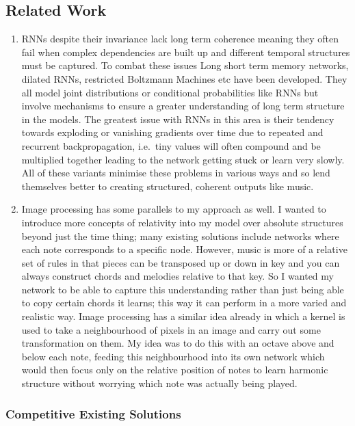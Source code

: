 \documentclass[12pt,]{article}
\begin{document}
\hypertarget{related-work}{%
\subsection{Related Work}\label{related-work}}

\begin{enumerate}
\def\labelenumi{\arabic{enumi}.}
\setcounter{enumi}{3}
\item
  RNNs despite their invariance lack long term coherence meaning they
  often fail when complex dependencies are built up and different
  temporal structures must be captured. To combat these issues Long
  short term memory networks, dilated RNNs, restricted Boltzmann
  Machines etc have been developed. They all model joint distributions
  or conditional probabilities like RNNs but involve mechanisms to
  ensure a greater understanding of long term structure in the models.
  The greatest issue with RNNs in this area is their tendency towards
  exploding or vanishing gradients over time due to repeated and
  recurrent backpropagation, i.e.~tiny values will often compound and be
  multiplied together leading to the network getting stuck or learn very
  slowly. All of these variants minimise these problems in various ways
  and so lend themselves better to creating structured, coherent outputs
  like music.
\item
  Image processing has some parallels to my approach as well. I wanted
  to introduce more concepts of relativity into my model over absolute
  structures beyond just the time thing; many existing solutions include
  networks where each note corresponds to a specific node. However,
  music is more of a relative set of rules in that pieces can be
  transposed up or down in key and you can always construct chords and
  melodies relative to that key. So I wanted my network to be able to
  capture this understanding rather than just being able to copy certain
  chords it learns; this way it can perform in a more varied and
  realistic way. Image processing has a similar idea already in which a
  kernel is used to take a neighbourhood of pixels in an image and carry
  out some transformation on them. My idea was to do this with an octave
  above and below each note, feeding this neighbourhood into its own
  network which would then focus only on the relative position of notes
  to learn harmonic structure without worrying which note was actually
  being played.
\end{enumerate}

\hypertarget{competitive-existing-solutions}{%
\subsubsection{Competitive Existing
Solutions}\label{competitive-existing-solutions}}
\end{document}
